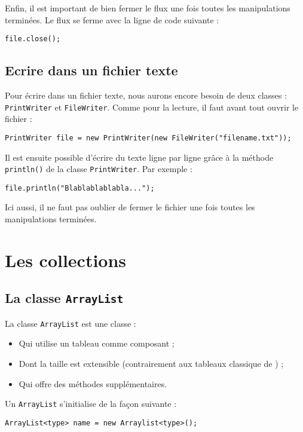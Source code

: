 Enfin, il est important de bien fermer le flux une fois toutes les manipulations terminées. Le flux se ferme avec la ligne de code suivante :

\begin{lstlisting}
file.close();
\end{lstlisting}

\subsection{Ecrire dans un fichier texte}
Pour écrire dans un fichier texte, nous aurons encore besoin de deux classes : \lstinline|PrintWriter| et \lstinline|FileWriter|. Comme pour la lecture, il faut avant tout ouvrir le fichier :

\begin{lstlisting}
PrintWriter file = new PrintWriter(new FileWriter("filename.txt"));
\end{lstlisting}

Il est ensuite possible d'écrire du texte ligne par ligne grâce à la méthode \lstinline|println()| de la classe \lstinline|PrintWriter|. Par exemple :

\begin{lstlisting}
file.println("Blablablablabla...");
\end{lstlisting}

Ici aussi, il ne faut pas oublier de fermer le fichier une fois toutes les manipulations terminées.

\section{Les collections}
\subsection{La classe \lstinline|ArrayList|}
La classe \lstinline|ArrayList| est une classe :

\begin{itemize}
\item Qui utilise un tableau comme composant ;
\item Dont la taille est extensible (contrairement aux tableaux classique de \java{}) ;
\item Qui offre des méthodes supplémentaires.
\end{itemize}

Un \lstinline|ArrayList| s'initialise de la façon suivante :

\begin{lstlisting}
ArrayList<type> name = new Arraylist<type>();
\end{lstlisting}

